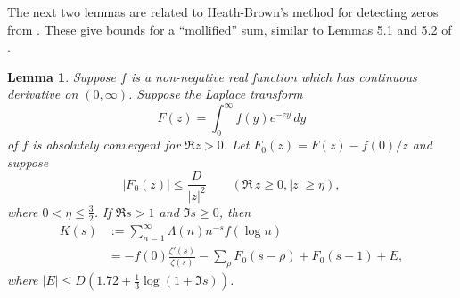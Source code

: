 \documentclass[10pt]{amsart}
\theoremstyle{remark}
\theoremstyle{plain}
\newtheorem{lemma}{Lemma}[section]
\numberwithin{equation}{section}
\theoremstyle{definition}
\begin{document}
%
%

The next two lemmas are related to Heath-Brown's method for detecting
zeros from \cite{HB2}.  These give bounds for
a ``mollified'' sum, similar to Lemmas 5.1 and 5.2 of \cite{HB2}.

\begin{lemma}\label{lem:K(s)}
Suppose $f$ is a non-negative real function which has
continuous derivative on $(0,\infty)$. Suppose the Laplace transform
$$
F(z)=\int_0^\infty f(y) e^{-zy}\, dy
$$
of $f$ is absolutely
convergent for $\Re z > 0$.  Let $F_0(z) = F(z) - f(0)/z$ and suppose
\begin{equation}
|F_0(z)| \le  \frac{D}{|z|^2} \qquad (\Re\, z \ge 0, |z| \ge \eta),
\label{eq:F_0}
\end{equation}
where $0<\eta \le \frac32$.  If $\Re s > 1$ and $\Im s \ge 0$, then
\begin{align*}
K(s) &:= \sum_{n=1}^\infty \Lambda(n) n^{-s} f(\log n) \\
&= -f(0) 
\frac{\zeta'(s)}{\zeta(s)} - \sum_\rho F_0(s-\rho)+ F_0(s-1) + E,
\end{align*}
where $|E| \le D(1.72 + \tfrac13 \log(1+\Im s))$.
\end{lemma}
\end{document}
